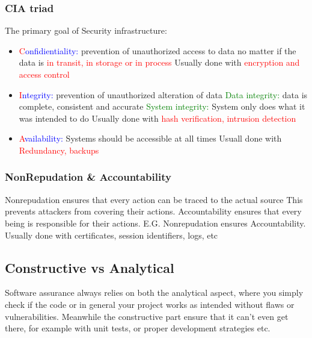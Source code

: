 \documentclass[main.tex,fontsize=12pt,paper=a4,paper=landscape,DIV=calc,]{scrartcl}
\begin{document}
\begin{multicols*}{2}
\subsubsection{CIA triad}
The primary goal of Security infrastructure:\newline
\begin{itemize}
  \item \textcolor{red}{C}\textcolor{blue}{onfidientiality:} prevention of unauthorized access to data\newline
{no matter if the data is \textcolor{red}{in transit, in storage or in process}}\newline
{Usually done with \textcolor{red}{encryption and access control}}
\item \textcolor{red}{I}\textcolor{blue}{ntegrity:} prevention of unauthorized alteration of data\newline
{\textcolor{green}{Data integrity:} data is complete, consistent and accurate}\newline
{\textcolor{green}{System integrity:} System only does what it was intended to do}\newline
{Usually  done with \textcolor{red}{hash verification, intrusion detection}}
\item \textcolor{red}{A}\textcolor{blue}{vailability:} Systems should be accessible at all times\newline
{Usuall done with \textcolor{red}{Redundancy, backups}}
\end{itemize} 

\subsubsection{NonRepudation \& Accountability}
Nonrepudation ensures that every action can be traced to the actual source\newline
This prevents attackers from covering their actions.\newline
Accountability ensures that every being is responsible for their actions.\newline
E.G. Nonrepudation ensures Accountability.\newline
Usually done with certificates, session identifiers, logs, etc

\subsection{Constructive vs Analytical}
Software assurance always relies on both the analytical aspect, where you simply check if the code or in general your project works as intended without flaws or vulnerabilities. \newline
Meanwhile the constructive part ensure that it can't even get there, for example with unit tests, or proper development strategies etc. 


\end{multicols*}
\end{document}
